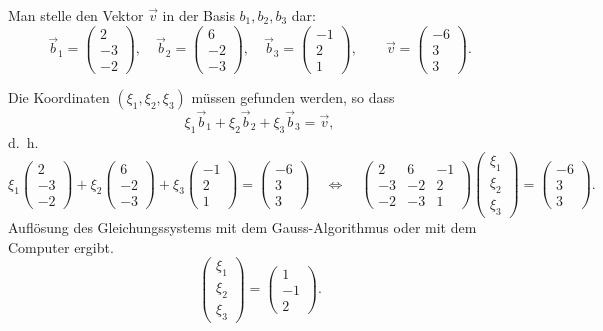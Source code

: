 \begin{beispiel}
Man stelle den Vektor $\vec v$ in der Basis $b_1,b_2,b_3$ dar:
\[
\vec b_1=\begin{pmatrix}2\\-3\\-2\end{pmatrix},\quad
\vec b_2=\begin{pmatrix}6\\-2\\-3\end{pmatrix},\quad
\vec b_3=\begin{pmatrix}-1\\2\\1\end{pmatrix},\qquad
\vec v=\begin{pmatrix}-6\\3\\3\end{pmatrix}.
\]

\smallskip

{\parindent 0pt
Die} Koordinaten $(\xi_1,\xi_2,\xi_3)$ müssen gefunden
werden, so dass
\[
\xi_1\vec b_1+
\xi_2\vec b_2+
\xi_3\vec b_3
=
\vec v,
\]
d.~h.
\[
\xi_1\begin{pmatrix}2\\-3\\-2\end{pmatrix}+
\xi_2\begin{pmatrix}6\\-2\\-3\end{pmatrix}+
\xi_3\begin{pmatrix}-1\\2\\1\end{pmatrix}=
\begin{pmatrix}-6\\3\\3\end{pmatrix}
\quad
\Leftrightarrow
\quad
\begin{pmatrix}
2&6&-1\\
-3&-2&2\\
-2&-3&1
\end{pmatrix}
\begin{pmatrix}\xi_1\\\xi_2\\\xi_3\end{pmatrix}
=
\begin{pmatrix}-6\\3\\3\end{pmatrix}.
\]
Auflösung des Gleichungssystems mit dem Gauss-Algorithmus oder mit
dem Computer ergibt.
\[
\begin{pmatrix}\xi_1\\\xi_2\\\xi_3\end{pmatrix}
=
\begin{pmatrix}1\\-1\\2 \end{pmatrix}.
\]
\end{beispiel}

